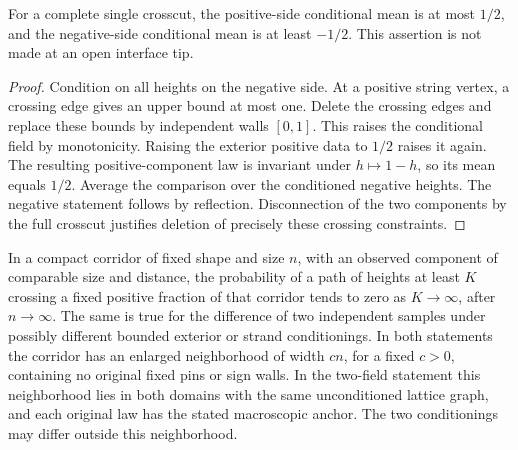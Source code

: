 \begin{lemma}\label{g:upper-half}
For a complete single crosscut, the positive-side conditional mean is
at most \(1/2\), and the negative-side conditional mean is at least
\(-1/2\). This assertion is not made at an open interface tip.
\end{lemma}

\begin{proof}
Condition on all heights on the negative side. At a positive string
vertex, a crossing edge gives an upper bound at most one. Delete the
crossing edges and replace these bounds by independent walls \([0,1]\).
This raises the conditional field by monotonicity. Raising the exterior
positive data to \(1/2\) raises it again. The resulting positive-component
law is invariant under \(h\mapsto1-h\), so its mean equals \(1/2\).
Average the comparison over the conditioned negative heights. The
negative statement follows by reflection. Disconnection of the two
components by the full crosscut justifies deletion of precisely these
crossing constraints.
\end{proof}

\begin{lemma}\label{g:high-crossing}
In a compact corridor of fixed shape and size \(n\), with an observed
component of comparable size and distance, the probability of a path
of heights at least \(K\) crossing a fixed positive fraction of that
corridor tends to zero as \(K\to\infty\), after \(n\to\infty\).
The same is true for the difference of two independent samples under
possibly different bounded exterior or strand conditionings.
In both statements the corridor has an enlarged neighborhood of
width \(cn\), for a fixed \(c>0\), containing no original fixed pins
or sign walls. In the two-field statement this neighborhood lies
in both domains with the same unconditioned lattice graph, and
each original law has the stated macroscopic anchor. The two
conditionings may differ outside this neighborhood.
\end{lemma}

